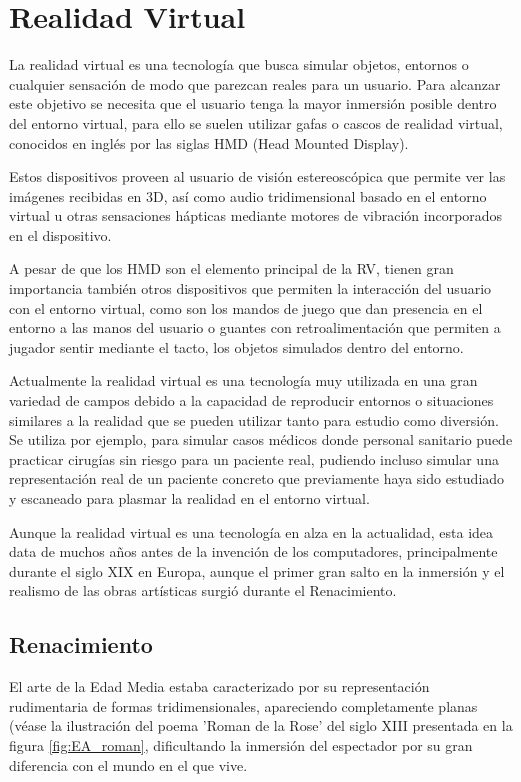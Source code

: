 \section{Realidad Virtual}

La realidad virtual es una tecnología que busca simular objetos, entornos o cualquier sensación de modo que parezcan reales para un usuario. Para alcanzar este objetivo se necesita que el usuario tenga la mayor inmersión posible dentro del entorno virtual, para ello se suelen utilizar gafas o cascos de realidad virtual, conocidos en inglés por las siglas HMD (Head Mounted Display).

Estos dispositivos proveen al usuario de visión estereoscópica que permite ver las imágenes recibidas en 3D, así como audio tridimensional basado en el entorno virtual u otras sensaciones hápticas mediante motores de vibración incorporados en el dispositivo. 

A pesar de que los HMD son el elemento principal de la RV, tienen gran importancia también otros dispositivos que permiten la interacción del usuario con el entorno virtual, como son los mandos de juego que dan presencia en el entorno a las manos del usuario o guantes con retroalimentación que permiten a jugador sentir mediante el tacto, los objetos simulados dentro del entorno.

Actualmente la realidad virtual es una tecnología muy utilizada en una gran variedad de campos debido a la capacidad de reproducir entornos o situaciones similares a la realidad que se pueden utilizar tanto para estudio como diversión. Se utiliza por ejemplo, para simular casos médicos donde personal sanitario puede practicar cirugías sin riesgo para un paciente real, pudiendo incluso simular una representación real de un paciente concreto que previamente haya sido estudiado y escaneado para plasmar la realidad en el entorno virtual. 

Aunque la realidad virtual es una tecnología en alza en la actualidad, esta idea data de muchos años antes de la invención de los computadores, principalmente durante el siglo XIX en Europa, aunque el primer gran salto en la inmersión y el realismo de las obras artísticas surgió durante el Renacimiento.




\subsection{Renacimiento}

El arte de la Edad Media estaba caracterizado por su representación rudimentaria de formas tridimensionales, apareciendo completamente planas (véase la ilustración del poema 'Roman de la Rose' del siglo XIII presentada en la figura \ref{fig:EA_roman}, dificultando la inmersión del espectador por su gran diferencia con el mundo en el que vive.

